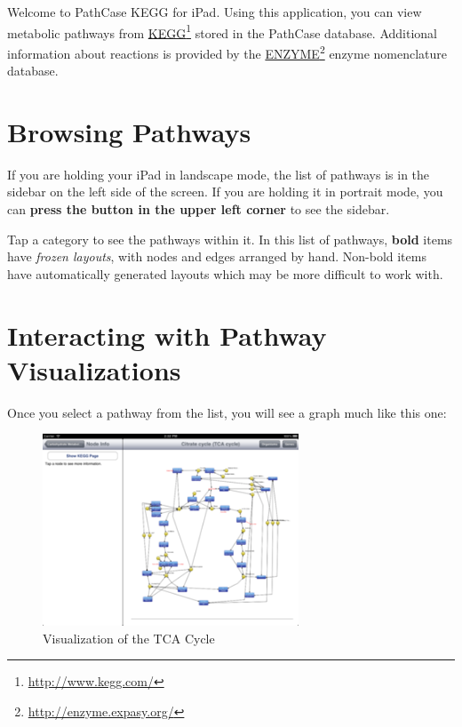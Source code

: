 Welcome to PathCase KEGG for iPad. Using this application, you can view
metabolic pathways from \href{http://www.kegg.com/}{KEGG}\footnote{\href{http://www.kegg.com/}{http:/\slash www.kegg.com\slash }} stored in the PathCase database. Additional
information about reactions is provided by the \href{http://enzyme.expasy.org/}{ENZYME}\footnote{\href{http://enzyme.expasy.org/}{http:/\slash enzyme.expasy.org\slash }} enzyme nomenclature
database.

\section{Browsing Pathways}
\label{browsingpathways}

If you are holding your iPad in landscape mode, the list of pathways is in the
sidebar on the left side of the screen. If you are holding it in portrait mode,
you can \textbf{press the button in the upper left corner} to see the sidebar.

Tap a category to see the pathways within it. In this list of pathways, \textbf{bold}
items have \emph{frozen layouts}, with nodes and edges arranged by hand. Non-bold
items have automatically generated layouts which may be more difficult to work
with.

\section{Interacting with Pathway Visualizations}
\label{interactingwithpathwayvisualizations}

Once you select a pathway from the list, you will see a graph much like this
one:

\begin{figure}[ht!]
\centering
\includegraphics[width=3in]{kegg_manual/pathway.png}
\caption{Visualization of the TCA Cycle}

\end{figure}



